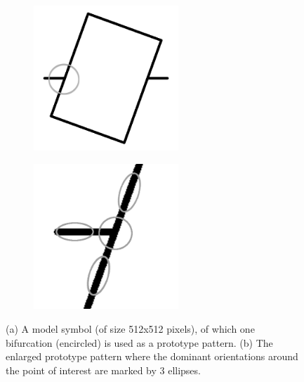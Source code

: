 \begin{figure}[h]
        \centering
        \begin{subfigure}[b]{0.36\textwidth}
                \centering
                \includegraphics[width=0.6\textwidth]{figures/Method/ModelPointOfInterest.png}
                \caption{}
                \label{fig:examplesymbol}
        \end{subfigure}
        \begin{subfigure}[b]{0.36\textwidth}
                \centering
                \includegraphics[width=0.6\textwidth]{figures/Method/DominantOrientationsAroundPointOfInterest.png}
                \caption{}
                \label{fig:modelsymbolvertex}
        \end{subfigure}
        \caption[Example of a prototype pattern]{(a) A model symbol (of size 512x512 pixels), of which one bifurcation (encircled) is used as a prototype pattern. (b) The enlarged prototype pattern where the dominant orientations around the point of interest are marked by 3 ellipses.}
        \label{fig:ProtoTypePatternExample}
\end{figure}

